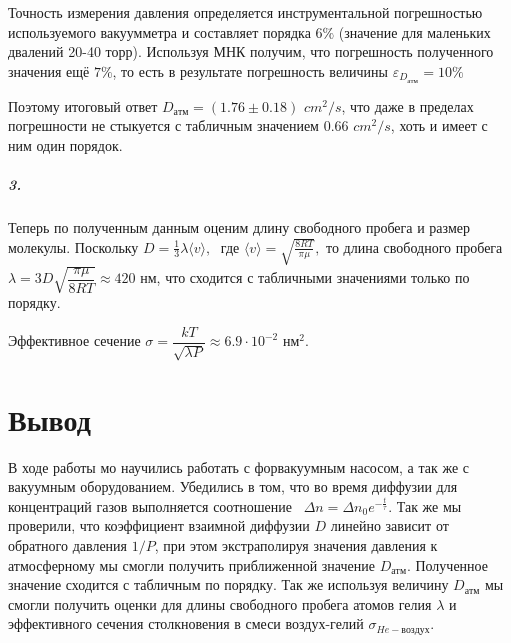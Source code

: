 \documentclass[a4paper,12pt]{article}
\begin{document}
Точность измерения давления определяется инструментальной погрешностью используемого вакуумметра и составляет порядка $6\%$ (значение для маленьких двалений 20-40 торр). Используя МНК получим, что погрешность полученного значения ещё $7\%$, то есть в результате погрешность величины $\varepsilon_{D_{атм} }= 10\%$

Поэтому итоговый ответ $D_{атм} = (1.76 \pm 0.18)$ $ cm^2/s$, что даже в пределах погрешности не стыкуется с табличным значением 0.66 $ cm^2/s$, хоть и имеет с ним один порядок.

\newpage

\subparagraph*{3.}


Теперь по полученным данным оценим длину свободного пробега и размер молекулы.  Поскольку 
$D = \frac{1}{3} \lambda \langle v \rangle,\;$ где $\langle v \rangle = \sqrt{\frac{8RT}{\pi \mu}},$
то длина свободного пробега $\lambda = 3D\sqrt{\dfrac{\pi \mu}{8RT}} \approx 420$ нм, что сходится с табличными значениями только по порядку.


Эффективное сечение  $\sigma = \dfrac{kT}{\sqrt{\lambda P}} \approx 6.9 \cdot 10^{-2} $ $нм^2$.



	
\newpage
	
\section*{Вывод}

В ходе работы мо научились работать с форвакуумным насосом, а так же с вакуумным оборудованием. Убедились в том, что во время диффузии для концентраций газов выполняется соотношение  $\Delta n = \Delta n_0 e^{-\frac{t}{\tau}}$. Так же мы проверили, что коэффициент взаимной диффузии $D$ линейно зависит от обратного давления $1 / P$, при этом экстраполируя значения давления к атмосферному мы смогли получить приближенной значение $D_{атм}$. Полученное значение сходится с табличным по порядку. Так же используя величину $D_{атм}$ мы смогли получить оценки для длины свободного пробега атомов гелия $\lambda$ и  эффективного сечения столкновения в смеси воздух-гелий $\sigma_{He-воздух}$. 
\end{document}
